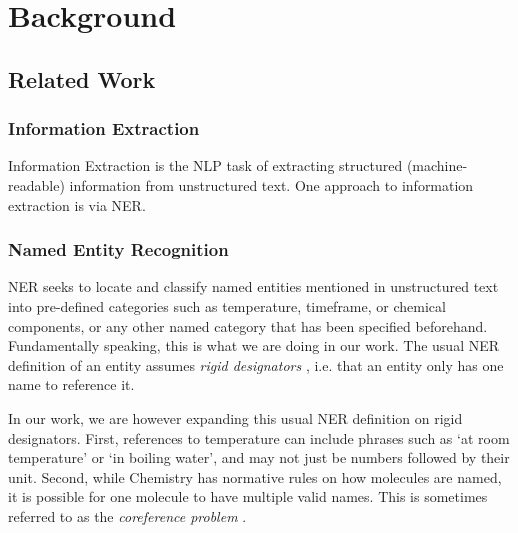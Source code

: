 \chapter{Background}\label{chap:background}


% 



\section{Related Work}\label{sec:related}
\subsection{Information Extraction}\label{sub:extraction}
Information Extraction is the \gls{NLP} task of extracting structured (machine-readable) information from unstructured text.
One approach to information extraction is via \gls{NER}.

\subsection{Named Entity Recognition}\label{sub:NER}
\gls{NER} seeks to locate and classify named entities mentioned in unstructured text into pre-defined categories \cite{li_survey_2022} such as temperature, timeframe, or chemical components, or any other named category that has been specified beforehand.
Fundamentally speaking, this is what we are doing in our work.
The usual \gls{NER} definition of an entity assumes \textit{rigid designators} \cite{laporte_rigid_2022}, i.e. that an entity only has one name to reference it.

In our work, we are however expanding this usual \gls{NER} definition on rigid designators.
First, references to temperature can include phrases such as `at room temperature' or `in boiling water', and may not just be numbers followed by their unit.
Second, while Chemistry has normative rules on how molecules are named, it is possible for one molecule to have multiple valid names. This is sometimes referred to as the \textit{coreference problem} \cite{hobbs_coherence_1979}.

